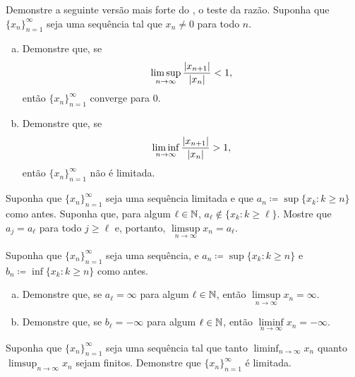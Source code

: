 \begin{exercise} \label{exercise:strongerratiotest2}
Demonstre a seguinte versão mais forte do , o teste
da razão.
Suponha que $\{ x_n \}_{n=1}^\infty$ seja uma sequência tal que $x_n \neq 0$ para todo
$n$.
\begin{enumerate}[a)]
\item
Demonstre que, se
\begin{equation*}
\limsup_{n \to \infty} \frac{\lvert {x_{n+1}} \rvert}{\lvert {x_n} \rvert} < 1 ,
\end{equation*}
então $\{ x_n \}_{n=1}^\infty$ converge para $0$.
\item
Demonstre que, se
\begin{equation*}
\liminf_{n \to \infty} \frac{\lvert {x_{n+1}} \rvert}{\lvert {x_n} \rvert} > 1 ,
\end{equation*}
então $\{ x_n \}_{n=1}^\infty$ não é limitada.
\end{enumerate}
\end{exercise}

\begin{exercise}
Suponha que $\{ x_n \}_{n=1}^\infty$ seja uma sequência limitada e que $a_n \coloneqq \sup \{ x_k : k \geq n \}$
como antes. Suponha que, para algum $\ell \in {\mathbb{N}}$,
$a_\ell \notin \{ x_k : k \geq \ell \}$. Mostre que $a_j = a_\ell$ para todo $j \geq \ell$ e, portanto,
$\limsup\limits_{n\to\infty} x_n = a_\ell$.
\end{exercise}

\begin{exercise}
Suponha que $\{ x_n \}_{n=1}^\infty$ seja uma sequência,
e $a_n \coloneqq \sup \{ x_k : k \geq n \}$ e
$b_n \coloneqq \inf \{ x_k : k \geq n \}$ como antes.
\begin{enumerate}[a)]
\item
Demonstre que, se $a_\ell = \infty$ para algum $\ell \in {\mathbb{N}}$, então
$\limsup\limits_{n\to\infty} x_n = \infty$.
\item
Demonstre que, se $b_\ell = -\infty$ para algum $\ell \in {\mathbb{N}}$, então
$\liminf\limits_{n\to\infty} x_n = -\infty$.
\end{enumerate}
\end{exercise}

\begin{exercise}
Suponha que $\{ x_n \}_{n=1}^\infty$ seja uma sequência
tal que tanto $\liminf_{n\to\infty} x_n$ quanto
$\limsup_{n\to\infty} x_n$ sejam finitos. Demonstre que $\{ x_n \}_{n=1}^\infty$ é limitada.
\end{exercise}

